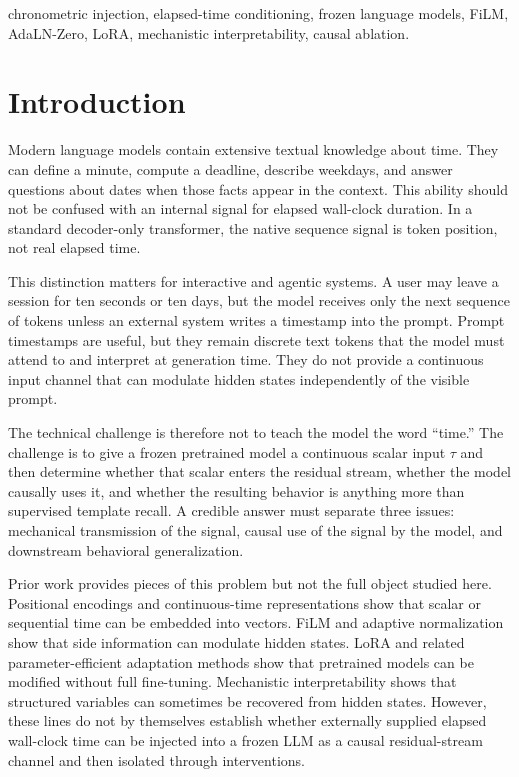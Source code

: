 \documentclass[conference,10pt]{IEEEtran}
\newcommand{\Tau}{\tau}
\begin{document}
\begin{abstract}
of subjective time perception and not as a universal replacement for prompt-based timestamps.
\end{abstract}

\begin{IEEEkeywords}
chronometric injection, elapsed-time conditioning, frozen language models, FiLM, AdaLN-Zero, LoRA, mechanistic interpretability, causal ablation.
\end{IEEEkeywords}

\section{Introduction}

Modern language models contain extensive textual knowledge about time. They can define a minute, compute a deadline, describe weekdays, and answer questions about dates when those facts appear in the context. This ability should not be confused with an internal signal for elapsed wall-clock duration. In a standard decoder-only transformer, the native sequence signal is token position, not real elapsed time.

This distinction matters for interactive and agentic systems. A user may leave a session for ten seconds or ten days, but the model receives only the next sequence of tokens unless an external system writes a timestamp into the prompt. Prompt timestamps are useful, but they remain discrete text tokens that the model must attend to and interpret at generation time. They do not provide a continuous input channel that can modulate hidden states independently of the visible prompt.

The technical challenge is therefore not to teach the model the word ``time.'' The challenge is to give a frozen pretrained model a continuous scalar input $\Tau$ and then determine whether that scalar enters the residual stream, whether the model causally uses it, and whether the resulting behavior is anything more than supervised template recall. A credible answer must separate three issues: mechanical transmission of the signal, causal use of the signal by the model, and downstream behavioral generalization.

Prior work provides pieces of this problem but not the full object studied here. Positional encodings and continuous-time representations show that scalar or sequential time can be embedded into vectors. FiLM and adaptive normalization show that side information can modulate hidden states. LoRA and related parameter-efficient adaptation methods show that pretrained models can be modified without full fine-tuning. Mechanistic interpretability shows that structured variables can sometimes be recovered from hidden states. However, these lines do not by themselves establish whether externally supplied elapsed wall-clock time can be injected into a frozen LLM as a causal residual-stream channel and then isolated through interventions.
\end{document}
